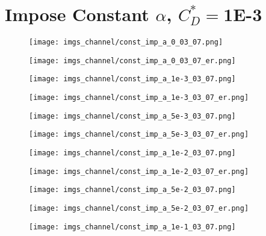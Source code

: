 \documentclass[12pt,a4paper]{article}
\begin{document}
\section{Impose Constant $\alpha$, $C_D^* = $1E-3}
\newpage
\begin{figure}
\centering
\texttt{[image: imgs\_channel/const\_imp\_a\_0\_03\_07.png]}
\end{figure}

\begin{figure}
\centering
\texttt{[image: imgs\_channel/const\_imp\_a\_0\_03\_07\_er.png]}
\end{figure}
\clearpage
\begin{figure}
\centering
\texttt{[image: imgs\_channel/const\_imp\_a\_1e-3\_03\_07.png]}
\end{figure}

\begin{figure}
\centering
\texttt{[image: imgs\_channel/const\_imp\_a\_1e-3\_03\_07\_er.png]}
\end{figure}

\begin{figure}
\centering
\texttt{[image: imgs\_channel/const\_imp\_a\_5e-3\_03\_07.png]}
\end{figure}

\begin{figure}
\centering
\texttt{[image: imgs\_channel/const\_imp\_a\_5e-3\_03\_07\_er.png]}
\end{figure}

\begin{figure}
\centering
\texttt{[image: imgs\_channel/const\_imp\_a\_1e-2\_03\_07.png]}
\end{figure}

\begin{figure}
\centering
\texttt{[image: imgs\_channel/const\_imp\_a\_1e-2\_03\_07\_er.png]}
\end{figure}

\begin{figure}
\centering
\texttt{[image: imgs\_channel/const\_imp\_a\_5e-2\_03\_07.png]}
\end{figure}

\begin{figure}
\centering
\texttt{[image: imgs\_channel/const\_imp\_a\_5e-2\_03\_07\_er.png]}
\end{figure}

\begin{figure}
\centering
\texttt{[image: imgs\_channel/const\_imp\_a\_1e-1\_03\_07.png]}
\end{figure}
\end{document}

